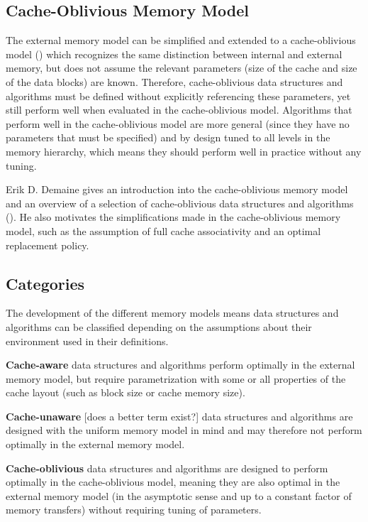 \documentclass{acm_proc_article-sp}
\begin{document}
\subsection{Cache-Oblivious Memory Model}
The external memory model can be simplified and extended to a cache-oblivious model (\cite{prokop1999coa}) which recognizes the same distinction between internal and external memory, but does not assume the relevant parameters (size of the cache and size of the data blocks) are known. Therefore, cache-oblivious data structures and algorithms must be defined without explicitly referencing these parameters, yet still perform well when evaluated in the cache-oblivious model. Algorithms that perform well in the cache-oblivious model are more general (since they have no parameters that must be specified) and by design tuned to all levels in the memory hierarchy, which means they should perform well in practice without any tuning.

Erik D. Demaine gives an introduction into the cache-oblivious memory model and an overview of a selection of cache-oblivious data structures and algorithms (\cite{demaine2002coa}). He also motivates the simplifications made in the cache-oblivious memory model, such as the assumption of full cache associativity and an optimal replacement policy.

\subsection{Categories}
The development of the different memory models means data structures and algorithms can be classified depending on the assumptions about their environment used in their definitions.
\begin{list}{}{}
\item \textbf{Cache-aware} data structures and algorithms perform optimally in the external memory model, but require parametrization with some or all properties of the cache layout (such as block size or cache memory size).
\item \textbf{Cache-unaware} [does a better term exist?] data structures and algorithms  are designed with the uniform memory model in mind and may therefore not perform optimally in the external memory model.
\item \textbf{Cache-oblivious} data structures and algorithms are designed to perform optimally in the cache-oblivious model, meaning they are also optimal in the external memory model (in the asymptotic sense and up to a constant factor of memory transfers) without requiring tuning of parameters.
\end{list}
\end{document}

